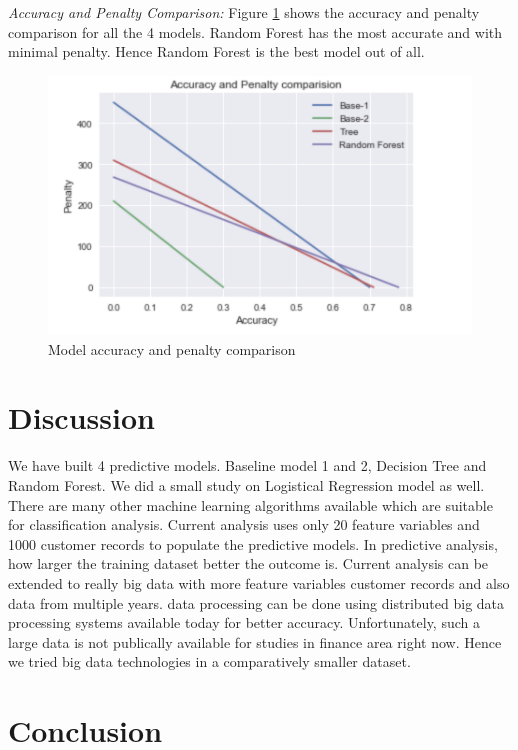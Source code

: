 \documentclass[sigconf]{acmart}
\begin{document}
\textit{Accuracy and Penalty Comparison:} Figure \ref{fig:Figure27} shows the accuracy and penalty comparison for all the 4 models. Random Forest has the most accurate and with minimal penalty. Hence Random Forest is the best model out of all.

\begin{figure}[htb]
  \centering
  \includegraphics[width=1.0\columnwidth]{images/Figure27.png}
  \caption{Model accuracy and penalty comparison}
  \label{fig:Figure27} 
\end{figure}

\section{Discussion}

We have built 4 predictive models. Baseline model 1 and 2, Decision Tree and Random Forest. We did a small study on Logistical Regression model as well. There are many other machine learning algorithms available which are suitable for classification analysis. Current analysis uses only 20 feature variables and 1000 customer records to populate the predictive models. In predictive analysis, how larger the training dataset better the outcome is. Current analysis can be extended to really big data with more feature variables customer records and also data from multiple years. data processing can be done using distributed big data processing systems available today for better accuracy. Unfortunately, such a large data is not publically available for studies in finance area right now. Hence we tried big data technologies in a comparatively smaller dataset. 


\section{Conclusion}
\end{document}
